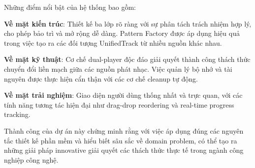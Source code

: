\documentclass[12pt,a4paper]{article}
\begin{document}
Những điểm nổi bật của hệ thống bao gồm:

\textbf{Về mặt kiến trúc}: Thiết kế ba lớp rõ ràng với sự phân tách trách nhiệm hợp lý, cho phép bảo trì và mở rộng dễ dàng. Pattern Factory được áp dụng hiệu quả trong việc tạo ra các đối tượng UnifiedTrack từ nhiều nguồn khác nhau.

\textbf{Về mặt kỹ thuật}: Cơ chế dual-player độc đáo giải quyết thành công thách thức chuyển đổi liền mạch giữa các nguồn phát nhạc. Việc quản lý bộ nhớ và tài nguyên được thực hiện cẩn thận với các cơ chế cleanup tự động.

\textbf{Về mặt trải nghiệm}: Giao diện người dùng thống nhất và trực quan, với các tính năng tương tác hiện đại như drag-drop reordering và real-time progress tracking.

Thành công của dự án này chứng minh rằng với việc áp dụng đúng các nguyên tắc thiết kế phần mềm và hiểu biết sâu sắc về domain problem, có thể tạo ra những giải pháp innovative giải quyết các thách thức thực tế trong ngành công nghiệp công nghệ.
\end{document}
